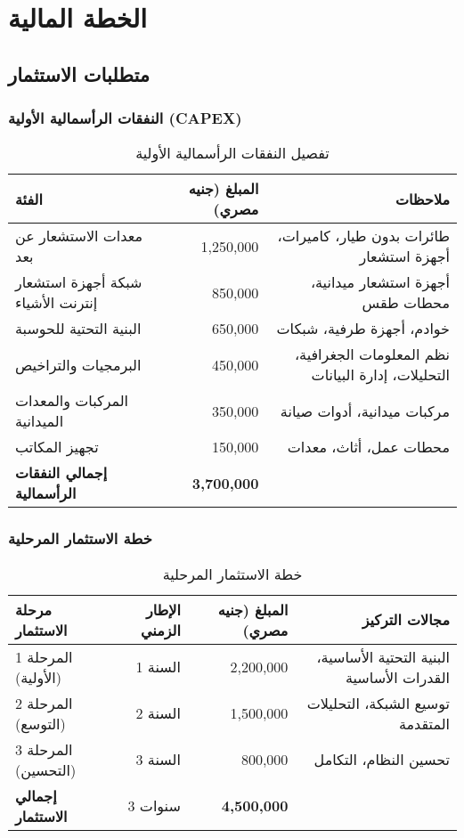 \section{الخطة المالية}

\subsection{متطلبات الاستثمار}

\subsubsection{النفقات الرأسمالية الأولية (CAPEX)}
\begin{table}[H]
\centering
\begin{tabular}{lrr}
\toprule
\textbf{الفئة} & \textbf{المبلغ (جنيه مصري)} & \textbf{ملاحظات} \\
\midrule
معدات الاستشعار عن بعد & 1,250,000 & طائرات بدون طيار، كاميرات، أجهزة استشعار \\
شبكة أجهزة استشعار إنترنت الأشياء & 850,000 & أجهزة استشعار ميدانية، محطات طقس \\
البنية التحتية للحوسبة & 650,000 & خوادم، أجهزة طرفية، شبكات \\
البرمجيات والتراخيص & 450,000 & نظم المعلومات الجغرافية، التحليلات، إدارة البيانات \\
المركبات والمعدات الميدانية & 350,000 & مركبات ميدانية، أدوات صيانة \\
تجهيز المكاتب & 150,000 & محطات عمل، أثاث، معدات \\
\midrule
\textbf{إجمالي النفقات الرأسمالية} & \textbf{3,700,000} & \\
\bottomrule
\end{tabular}
\caption{تفصيل النفقات الرأسمالية الأولية}
\end{table}

\subsubsection{خطة الاستثمار المرحلية}
\begin{table}[H]
\centering
\begin{tabular}{lrrr}
\toprule
\textbf{مرحلة الاستثمار} & \textbf{الإطار الزمني} & \textbf{المبلغ (جنيه مصري)} & \textbf{مجالات التركيز} \\
\midrule
المرحلة 1 (الأولية) & السنة 1 & 2,200,000 & البنية التحتية الأساسية، القدرات الأساسية \\
المرحلة 2 (التوسع) & السنة 2 & 1,500,000 & توسيع الشبكة، التحليلات المتقدمة \\
المرحلة 3 (التحسين) & السنة 3 & 800,000 & تحسين النظام، التكامل \\
\midrule
\textbf{إجمالي الاستثمار} & 3 سنوات & \textbf{4,500,000} & \\
\bottomrule
\end{tabular}
\caption{خطة الاستثمار المرحلية}
\end{table}

